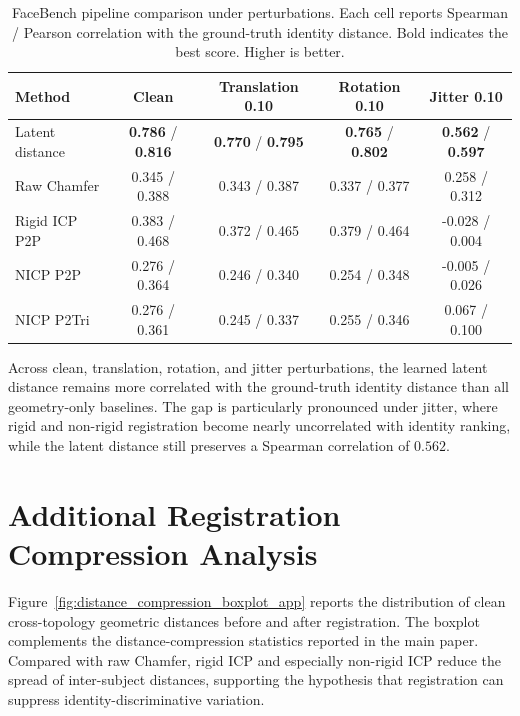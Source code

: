 \documentclass{article}
\begin{document}
\begin{table}[h]
\centering
\small
\caption{
FaceBench pipeline comparison under perturbations. Each cell reports Spearman /
Pearson correlation with the ground-truth identity distance. Bold indicates the
best score. Higher is better.
}
\label{tab:facebench_pipeline_perturbed_app}
\begin{tabular}{lcccc}
\toprule
Method & Clean & Translation 0.10 & Rotation 0.10 & Jitter 0.10 \\
\midrule
Latent distance
& \textbf{0.786} / \textbf{0.816}
& \textbf{0.770} / \textbf{0.795}
& \textbf{0.765} / \textbf{0.802}
& \textbf{0.562} / \textbf{0.597} \\

Raw Chamfer
& 0.345 / 0.388
& 0.343 / 0.387
& 0.337 / 0.377
& 0.258 / 0.312 \\

Rigid ICP P2P
& 0.383 / 0.468
& 0.372 / 0.465
& 0.379 / 0.464
& -0.028 / 0.004 \\

NICP P2P
& 0.276 / 0.364
& 0.246 / 0.340
& 0.254 / 0.348
& -0.005 / 0.026 \\

NICP P2Tri
& 0.276 / 0.361
& 0.245 / 0.337
& 0.255 / 0.346
& 0.067 / 0.100 \\
\bottomrule
\end{tabular}
\end{table}

Across clean, translation, rotation, and jitter perturbations, the learned
latent distance remains more correlated with the ground-truth identity distance
than all geometry-only baselines. The gap is particularly pronounced under
jitter, where rigid and non-rigid registration become nearly uncorrelated with
identity ranking, while the latent distance still preserves a Spearman
correlation of $0.562$.

\section{Additional Registration Compression Analysis}
\label{app:compression_analysis}

Figure~\ref{fig:distance_compression_boxplot_app} reports the distribution of
clean cross-topology geometric distances before and after registration. The
boxplot complements the distance-compression statistics reported in the main
paper. Compared with raw Chamfer, rigid ICP and especially non-rigid ICP reduce
the spread of inter-subject distances, supporting the hypothesis that
registration can suppress identity-discriminative variation.
\end{document}
